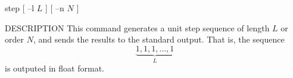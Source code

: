 % 
% 
% 
% 
%                                                                        
%

\begin{synopsis}
\item[step] [ --l $L$ ] [ --n $N$ ]
\end{synopsis}

\begin{qsection}{DESCRIPTION}
This command generates a unit step sequence of length $L$ or order $N$,
and sends the results to the standard output.
That is, the sequence 
\begin{displaymath}
\underbrace{1, 1, 1, \ldots, 1}_{L}
\end{displaymath}
is outputed in float format.
\end{qsection}

